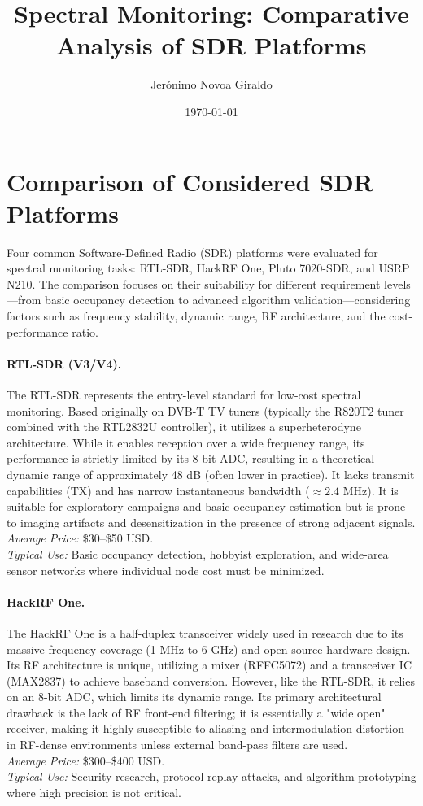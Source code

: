 \documentclass[11pt]{article}
\title{Spectral Monitoring: Comparative Analysis of SDR Platforms}
\author{Jerónimo Novoa Giraldo}
\date{\today}
\begin{document}
\maketitle

\section{Comparison of Considered SDR Platforms}

Four common Software-Defined Radio (SDR) platforms were evaluated for spectral monitoring tasks: RTL-SDR, HackRF One, Pluto 7020-SDR, and USRP N210. The comparison focuses on their suitability for different requirement levels—from basic occupancy detection to advanced algorithm validation—considering factors such as frequency stability, dynamic range, RF architecture, and the cost-performance ratio.

\paragraph{RTL-SDR (V3/V4).}
The RTL-SDR represents the entry-level standard for low-cost spectral monitoring. Based originally on DVB-T TV tuners (typically the R820T2 tuner combined with the RTL2832U controller), it utilizes a superheterodyne architecture. While it enables reception over a wide frequency range, its performance is strictly limited by its 8-bit ADC, resulting in a theoretical dynamic range of approximately 48 dB (often lower in practice). It lacks transmit capabilities (TX) and has narrow instantaneous bandwidth ($\approx 2.4$ MHz). It is suitable for exploratory campaigns and basic occupancy estimation but is prone to imaging artifacts and desensitization in the presence of strong adjacent signals.\\
\emph{Average Price:} \$30--\$50 USD.\\
\emph{Typical Use:} Basic occupancy detection, hobbyist exploration, and wide-area sensor networks where individual node cost must be minimized.

\paragraph{HackRF One.}
The HackRF One is a half-duplex transceiver widely used in research due to its massive frequency coverage (1 MHz to 6 GHz) and open-source hardware design. Its RF architecture is unique, utilizing a mixer (RFFC5072) and a transceiver IC (MAX2837) to achieve baseband conversion. However, like the RTL-SDR, it relies on an 8-bit ADC, which limits its dynamic range. Its primary architectural drawback is the lack of RF front-end filtering; it is essentially a "wide open" receiver, making it highly susceptible to aliasing and intermodulation distortion in RF-dense environments unless external band-pass filters are used.\\
\emph{Average Price:} \$300--\$400 USD.\\
\emph{Typical Use:} Security research, protocol replay attacks, and algorithm prototyping where high precision is not critical.
\end{document}
